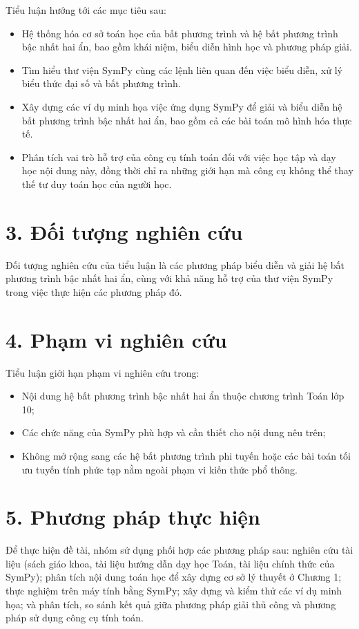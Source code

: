 \documentclass[12pt,a4paper]{report}
\begin{document}
Tiểu luận hướng tới các mục tiêu sau:
\begin{itemize}
\item Hệ thống hóa cơ sở toán học của bất phương trình và hệ bất phương trình bậc nhất hai ẩn, bao gồm khái niệm, biểu diễn hình học và phương pháp giải.
\item Tìm hiểu thư viện SymPy cùng các lệnh liên quan đến việc biểu diễn, xử lý biểu thức đại số và bất phương trình.
\item Xây dựng các ví dụ minh họa việc ứng dụng SymPy để giải và biểu diễn hệ bất phương trình bậc nhất hai ẩn, bao gồm cả các bài toán mô hình hóa thực tế.
\item Phân tích vai trò hỗ trợ của công cụ tính toán đối với việc học tập và dạy học nội dung này, đồng thời chỉ ra những giới hạn mà công cụ không thể thay thế tư duy toán học của người học.
\end{itemize}

\section*{3. Đối tượng nghiên cứu}

Đối tượng nghiên cứu của tiểu luận là các phương pháp biểu diễn và giải hệ bất phương trình bậc nhất hai ẩn, cùng với khả năng hỗ trợ của thư viện SymPy trong việc thực hiện các phương pháp đó.

\section*{4. Phạm vi nghiên cứu}

Tiểu luận giới hạn phạm vi nghiên cứu trong:
\begin{itemize}
\item Nội dung hệ bất phương trình bậc nhất hai ẩn thuộc chương trình Toán lớp 10;
\item Các chức năng của SymPy phù hợp và cần thiết cho nội dung nêu trên;
\item Không mở rộng sang các hệ bất phương trình phi tuyến hoặc các bài toán tối ưu tuyến tính phức tạp nằm ngoài phạm vi kiến thức phổ thông.
\end{itemize}

\section*{5. Phương pháp thực hiện}

Để thực hiện đề tài, nhóm sử dụng phối hợp các phương pháp sau: nghiên cứu tài liệu (sách giáo khoa, tài liệu hướng dẫn dạy học Toán, tài liệu chính thức của SymPy); phân tích nội dung toán học để xây dựng cơ sở lý thuyết ở Chương 1; thực nghiệm trên máy tính bằng SymPy; xây dựng và kiểm thử các ví dụ minh họa; và phân tích, so sánh kết quả giữa phương pháp giải thủ công và phương pháp sử dụng công cụ tính toán.
\end{document}
